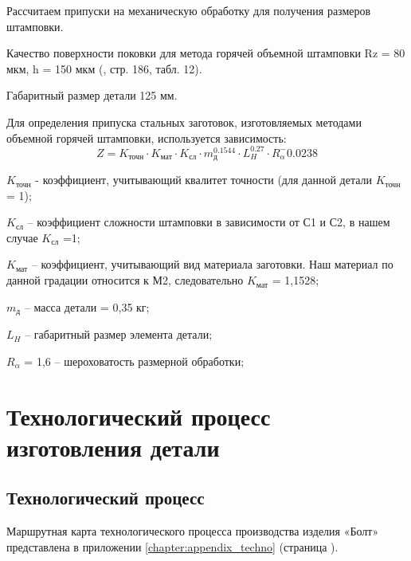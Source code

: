 Рассчитаем припуски на механическую обработку для получения размеров штамповки.

Качество поверхности поковки для метода горячей объемной штамповки Rz = 80 мкм, h = 150 мкм (\cite{TECHNO}, стр. 186, табл. 12).

Габаритный размер детали 125 мм.

Для определения припуска стальных заготовок, изготовляемых методами объемной горячей штамповки, используется зависимость:
$$Z = K_\text{точн} \cdot K_\text{мат} \cdot K_\text{сл} \cdot m_\text{д}^0.1544 \cdot L_H^0.27 \cdot R_\alpha^-0.0238 $$

$K_\text{точн}$ - коэффициент, учитывающий квалитет точности (для данной детали $K_\text{точн}$ = 1);

$K_\text{сл}$ – коэффициент сложности штамповки в зависимости от С1 и С2, в нашем случае $K_\text{сл}$ =1;

$K_\text{мат}$ – коэффициент, учитывающий вид материала заготовки. Наш материал по данной градации относится к М2, следовательно $K_\text{мат}$ = 1,1528;

$m_\text{д}$ – масса детали = 0,35 кг;

$L_H$ – габаритный размер элемента детали;

$R_\alpha $ = 1,6 – шероховатость размерной обработки;

\clearpage
\section{Технологический процесс изготовления детали}

\subsection{Технологический процесс}
Маршрутная карта технологического процесса производства изделия «Болт» представлена в приложении \ref{chapter:appendix_techno} (страница \pageref{chapter:appendix_techno}).

